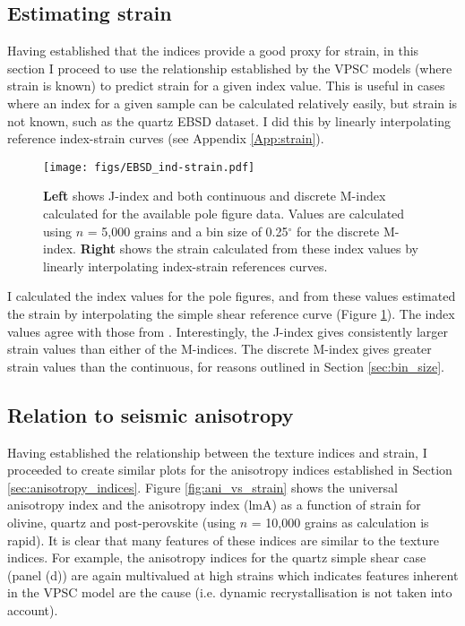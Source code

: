 \documentclass[a4paper,12pt,twoside]{report}
\numberwithin{equation}{chapter}
\begin{document}
\subsection{Estimating strain}

Having established that the indices provide a good proxy for strain, in this section I proceed to use the relationship established by the VPSC models (where strain is known) to predict strain for a given index value. This is useful in cases where an index for a given sample can be calculated relatively easily, but strain is not known, such as the quartz EBSD dataset. I did this by linearly interpolating reference index-strain curves (see Appendix \ref{App:strain}).


\begin{figure}[h]
  \centering
    \texttt{[image: figs/EBSD\_ind-strain.pdf]}
  \caption[Relationship of indices to strain (quartz EBSD)]{\textbf{Left} shows J-index and both continuous and discrete M-index calculated for the available pole figure data. Values are calculated using $n$ = 5,000 grains and a bin size of 0.25$^\circ$ for the discrete M-index. \textbf{Right} shows the strain calculated from these index values by linearly interpolating index-strain references curves.} 
  \label{fig:indices_vs_strain_qtz_EBSD}
\end{figure} 

I calculated the index values for the pole figures, and from these values estimated the strain by interpolating the simple shear reference curve (Figure \ref{fig:indices_vs_strain_qtz_EBSD}). The index values agree with those from \cite{ParsonsThesis}. Interestingly, the J-index gives consistently larger strain values than either of the M-indices. The discrete M-index gives greater strain values than the continuous, for reasons outlined in Section \ref{sec:bin_size}.  

\subsection{Relation to seismic anisotropy}


Having established the relationship between the texture indices and strain, I proceeded to create similar plots for the anisotropy indices established in Section \ref{sec:anisotropy_indices}. Figure \ref{fig:ani_vs_strain} shows the universal anisotropy index \citep[uA,][]{Ranganathan2008} and the \cite{Ledbetter2006} anisotropy index (lmA) as a function of strain for olivine, quartz and post-perovskite (using $n$ = 10,000 grains as calculation is rapid). It is clear that many features of these indices are similar to the texture indices. For example, the anisotropy indices for the quartz simple shear case (panel (d)) are again multivalued at high strains which indicates features inherent in the VPSC model are the cause (i.e. dynamic recrystallisation is not taken into account).    
\end{document}
